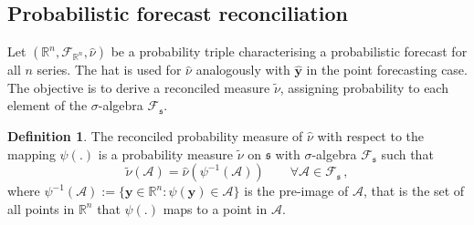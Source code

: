 \documentclass[12pt]{article}
\newtheorem{theo}{Theorem}[section]
\theoremstyle{definition}
\newtheorem{definition}{Definition}[section]
\begin{document}
%

\subsection{Probabilistic forecast reconciliation} \label{subsec:ProbForecastRecon}

Let $(\mathbb{R}^n, \mathscr{F}_{\mathbb{R}^n}, \hat{\nu})$ be a probability triple characterising a probabilistic forecast for all $n$ series. The hat is used for $\hat{\nu}$ analogously with $\hat{\bm y}$ in the point forecasting case.  The objective is to derive a reconciled measure $\tilde{\nu}$, assigning probability to each element of the $\sigma$-algebra $\mathscr{F}_\mathfrak{s}$.
 
\begin{definition} \label{def:reconprob}
	The reconciled probability measure of $\hat{\nu}$ with respect to the mapping $\psi(.)$ is a probability measure $\tilde{\nu}$ on $\mathfrak{s}$ with $\sigma$-algebra $\mathscr{F}_\mathfrak{s}$ such that
	\[
	\tilde{\nu}(\mathcal{A}) =  \hat{\nu}(\psi^{-1}(\mathcal{A})) \qquad \forall \mathcal{A} \in \mathscr{F}_{\mathfrak{s}}\,,
	\]
	where $\psi^{-1}(\mathcal{A}):=\{{\bm{y}}\in \mathbb{R}^n:\psi({\bm{y}})\in \mathcal{A}\}$ is the pre-image of $\mathcal{A}$, that is the set of all points in $\mathbb{R}^n$ that $\psi(.)$ maps to a point in $\mathcal{A}$.
\end{definition}
\end{document}
